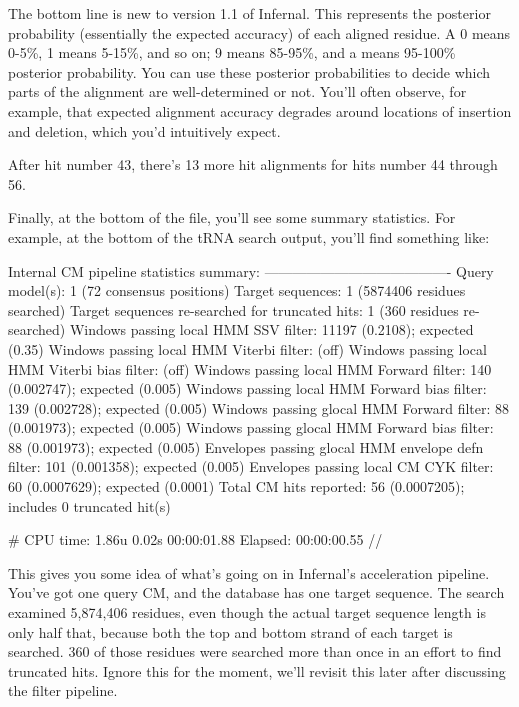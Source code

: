 The bottom line is new to version 1.1 of Infernal. This represents the
posterior probability (essentially the expected accuracy) of each
aligned residue. A 0 means 0-5\%, 1 means 5-15\%, and so on; 9 means
85-95\%, and a \prog{*} means 95-100\% posterior probability. You can
use these posterior probabilities to decide which parts of the
alignment are well-determined or not. You'll often observe, for
example, that expected alignment accuracy degrades around locations of
insertion and deletion, which you'd intuitively expect.

After hit number 43, there's 13 more hit alignments for hits number 44
through 56. 

Finally, at the bottom of the file, you'll see some summary
statistics. For example, at the bottom of the tRNA search output,
you'll find something like:

\begin{sreoutput}
Internal CM pipeline statistics summary:
----------------------------------------
Query model(s):                                                  1  (72 consensus positions)
Target sequences:                                                1  (5874406 residues searched)
Target sequences re-searched for truncated hits:                 1  (360 residues re-searched)
Windows   passing  local HMM SSV           filter:           11197  (0.2108); expected (0.35)
Windows   passing  local HMM Viterbi       filter:                  (off)
Windows   passing  local HMM Viterbi  bias filter:                  (off)
Windows   passing  local HMM Forward       filter:             140  (0.002747); expected (0.005)
Windows   passing  local HMM Forward  bias filter:             139  (0.002728); expected (0.005)
Windows   passing glocal HMM Forward       filter:              88  (0.001973); expected (0.005)
Windows   passing glocal HMM Forward  bias filter:              88  (0.001973); expected (0.005)
Envelopes passing glocal HMM envelope defn filter:             101  (0.001358); expected (0.005)
Envelopes passing  local CM  CYK           filter:              60  (0.0007629); expected (0.0001)
Total CM hits reported:                                         56  (0.0007205); includes 0 truncated hit(s)

# CPU time: 1.86u 0.02s 00:00:01.88 Elapsed: 00:00:00.55
//
\end{sreoutput}

This gives you some idea of what's going on in Infernal's acceleration
pipeline. You've got one query CM, and the database has one target
sequence. The search examined 5,874,406 residues, even though the
actual target sequence length is only half that, because both the top
and bottom strand of each target is searched. 360 of those residues
were searched more than once in an effort to find truncated
hits. Ignore this for the moment, we'll revisit this later after
discussing the filter pipeline. 

